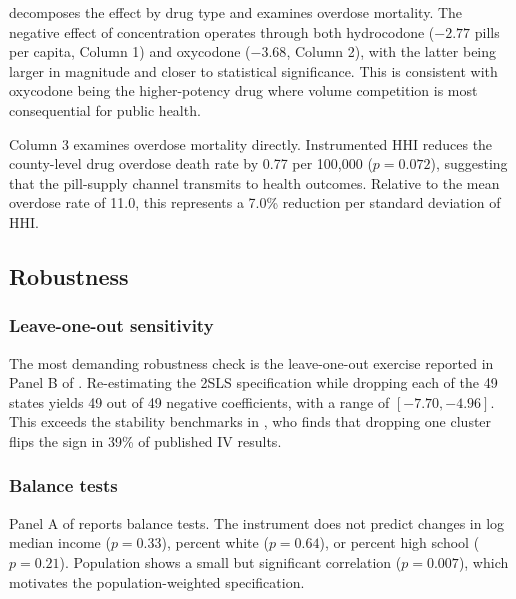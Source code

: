 \documentclass[12pt]{article}
\begin{document}
 decomposes the effect by drug type and examines overdose mortality. The negative effect of concentration operates through both hydrocodone ($-2.77$ pills per capita, Column 1) and oxycodone ($-3.68$, Column 2), with the latter being larger in magnitude and closer to statistical significance. This is consistent with oxycodone being the higher-potency drug where volume competition is most consequential for public health.

Column 3 examines overdose mortality directly. Instrumented HHI reduces the county-level drug overdose death rate by 0.77 per 100,000 ($p = 0.072$), suggesting that the pill-supply channel transmits to health outcomes. Relative to the mean overdose rate of 11.0, this represents a 7.0\% reduction per standard deviation of HHI.



\subsection{Robustness}

\subsubsection*{Leave-one-out sensitivity} The most demanding robustness check is the leave-one-out exercise reported in Panel B of . Re-estimating the 2SLS specification while dropping each of the 49 states yields 49 out of 49 negative coefficients, with a range of $[-7.70, -4.96]$. This exceeds the stability benchmarks in \citet{young2022consistency}, who finds that dropping one cluster flips the sign in 39\% of published IV results.

\subsubsection*{Balance tests} Panel A of  reports balance tests. The instrument does not predict changes in log median income ($p = 0.33$), percent white ($p = 0.64$), or percent high school ($p = 0.21$). Population shows a small but significant correlation ($p = 0.007$), which motivates the population-weighted specification.
\end{document}

